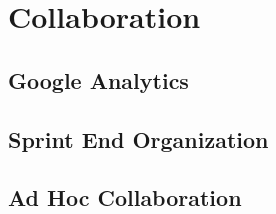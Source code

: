 \chapter{Collaboration}\label{chap:collaboration}


\section{Google Analytics}


\section{Sprint End Organization}\label{sec:collab:sprintend}


\section{Ad Hoc Collaboration}\label{sec:collab:adhoc}
